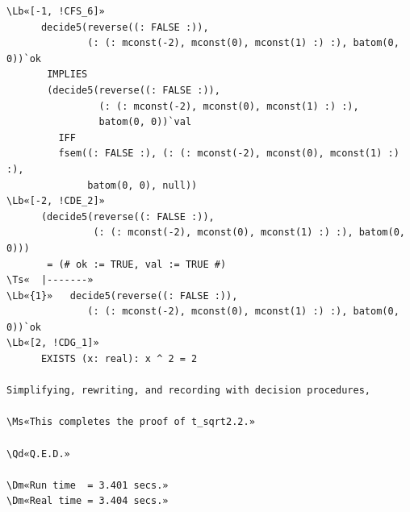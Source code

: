\documentclass[11pt]{article}
\newcommand\Ms[1]{\textcolor{moss}{\textbf{#1}}}
\newcommand\Qd[1]{\colorbox{mosssoft}{\textcolor{moss}{\textbf{#1}}}}
\newcommand\Dm[1]{\textcolor{muted}{#1}}
\newcommand\Lb[1]{\textcolor{muted}{#1}}
\newcommand\Ts[1]{\textcolor{muted}{#1}}
\begin{document}
\begin{enumerate}[leftmargin=1.4em, itemsep=10pt, label=\textbf{\textcolor{accent}{\arabic*}}]
\begin{termbox}
\begin{Verbatim}[commandchars=\\«»]
\Lb«[-1, !CFS_6]»
      decide5(reverse((: FALSE :)),
              (: (: mconst(-2), mconst(0), mconst(1) :) :), batom(0, 0))`ok
       IMPLIES
       (decide5(reverse((: FALSE :)),
                (: (: mconst(-2), mconst(0), mconst(1) :) :),
                batom(0, 0))`val
         IFF
         fsem((: FALSE :), (: (: mconst(-2), mconst(0), mconst(1) :) :),
              batom(0, 0), null))
\Lb«[-2, !CDE_2]»
      (decide5(reverse((: FALSE :)),
               (: (: mconst(-2), mconst(0), mconst(1) :) :), batom(0, 0)))
       = (# ok := TRUE, val := TRUE #)
\Ts«  |-------»
\Lb«{1}»   decide5(reverse((: FALSE :)),
              (: (: mconst(-2), mconst(0), mconst(1) :) :), batom(0, 0))`ok
\Lb«[2, !CDG_1]»
      EXISTS (x: real): x ^ 2 = 2

Simplifying, rewriting, and recording with decision procedures,

\Ms«This completes the proof of t_sqrt2.2.»

\Qd«Q.E.D.»

\Dm«Run time  = 3.401 secs.»
\Dm«Real time = 3.404 secs.»
\end{Verbatim}
\end{termbox}

\end{enumerate}
\end{document}
